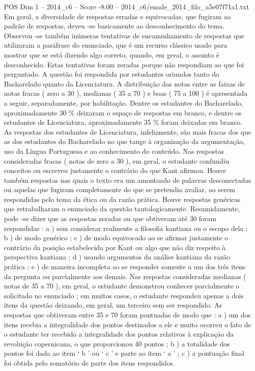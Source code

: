 \begin{textsample}{POS Dim 1 – 2014\_c6 – Score -8.00 – 2014\_c6/enade\_2014\_filo\_a5e07f71a1.txt}
Em geral, a diversidade de respostas erradas e equivocadas, que fugiram ao padrão de respostas, deveu -se basicamente ao desconhecimento do tema.
Observou -se também inúmeras tentativas de encaminhamento de respostas que utilizaram a paráfrase do enunciado, que é um recurso clássico usado para mostrar que se está dizendo algo correto, quando, em geral, o assunto é desconhecido.
Estas tentativas foram zeradas porque não respondiam ao que foi perguntado.
A questão foi respondida por estudantes oriundos tanto do Bacharelado quanto da Licenciatura.
A distribuição das notas entre as faixas de notas fracas ( zero a 30 ), medianas ( 35 a 70 ) e boas ( 75 a 100 ) é apresentada a seguir, separadamente, por habilitação.
Dentre os estudantes do Bacharelado, aproximadamente 30 \% deixaram o espaço de respostas em branco, e dentre os estudantes de Licenciatura, aproximadamente 35 \% foram deixadas em branco.
As respostas dos estudantes de Licenciatura, infelizmente, são mais fracas dos que as dos estudantes do Bacharelado no que tange à organização da argumentação, uso da Língua Portuguesa e ao conhecimento do conteúdo.
Nas respostas consideradas fracas ( notas de zero a 30 ), em geral, o estudante confundiu conceitos ou escreveu justamente o contrário do que Kant afirmou.
Houve também respostas nas quais o texto era um amontoado de palavras desconectadas ou aquelas que fugiram completamente do que se pretendia avaliar, ao serem respondidas pelo tema da ética ou da razão prática.
Houve respostas genéricas que retrabalharam o enunciado da questão tautologicamente.
Resumidamente, pode -se dizer que as respostas zeradas ou que obtiveram até 30 foram respondidas : a ) sem considerar realmente a filosofia kantiana ou o escopo dela ; b ) de modo genérico ; c ) de modo equivocado ao se afirmar justamente o contrário da posição estabelecida por Kant ou algo que não diz respeito à perspectiva kantiana ; d ) usando argumentos da análise kantiana da razão prática ; e ) de maneira incompleta ao se responder somente a um dos três itens da pergunta ou parcialmente aos demais.
Nas respostas consideradas medianas ( notas de 35 a 70 ), em geral, o estudante demonstrou conhecer parcialmente o solicitado no enunciado ; em muitos casos, o estudante respondeu apenas a dois itens da questão deixando, em geral, um terceiro sem ser respondido.
As respostas que obtiveram entre 35 e 70 foram pontuadas de modo que : a ) um dos itens recebia a integralidade dos pontos destinados a ele e muito ocorreu o fato de o estudante ter recebido a integralidade dos pontos relativos à explicação da revolução copernicana, o que proporcionou 40 pontos ; b ) a totalidade dos pontos foi dada ao item ‘ b ’ ou ‘ c ’ e parte ao item ‘ a ’ ; c ) a pontuação final foi obtida pelo somatório de parte dos itens respondidos.

\end{textsample}
